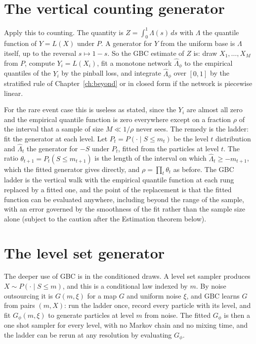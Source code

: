 \section{The vertical counting generator}

Apply this to counting. The quantity is $Z = \int_0^1 \Lambda(s) \, ds$ with $\Lambda$ the quantile function of $Y = L(X)$ under $P$. A generator for $Y$ from the uniform base is $\Lambda$ itself, up to the reversal $s \mapsto 1 - s$. So the GBC estimate of $Z$ is: draw $X_1, \dots, X_M$ from $P$, compute $Y_i = L(X_i)$, fit a monotone network $\hat\Lambda_\phi$ to the empirical quantiles of the $Y_i$ by the pinball loss, and integrate $\hat\Lambda_\phi$ over $[0, 1]$ by the stratified rule of Chapter~\ref{ch:beyond} or in closed form if the network is piecewise linear.

For the rare event case this is useless as stated, since the $Y_i$ are almost all zero and the empirical quantile function is zero everywhere except on a fraction $\rho$ of the interval that a sample of size $M \ll 1/\rho$ never sees. The remedy is the ladder: fit the generator at each level. Let $P_t = P(\cdot \mid S \le m_t)$ be the level $t$ distribution and $\hat\Lambda_t$ the generator for $-S$ under $P_t$, fitted from the particles at level $t$. The ratio $\theta_{t+1} = P_t(S \le m_{t+1})$ is the length of the interval on which $\hat\Lambda_t \ge -m_{t+1}$, which the fitted generator gives directly, and $\rho = \prod_t \theta_t$ as before. The GBC ladder is the vertical walk with the empirical quantile function at each rung replaced by a fitted one, and the point of the replacement is that the fitted function can be evaluated anywhere, including beyond the range of the sample, with an error governed by the smoothness of the fit rather than the sample size alone (subject to the caution after the Estimation theorem below).

\section{The level set generator}

The deeper use of GBC is in the conditioned draws. A level set sampler produces $X \sim P(\cdot \mid S \le m)$, and this is a conditional law indexed by $m$. By noise outsourcing it is $G(m, \xi)$ for a map $G$ and uniform noise $\xi$, and GBC learns $G$ from pairs $(m, X)$: run the ladder once, record every particle with its level, and fit $G_\phi(m, \xi)$ to generate particles at level $m$ from noise. The fitted $G_\phi$ is then a one shot sampler for every level, with no Markov chain and no mixing time, and the ladder can be rerun at any resolution by evaluating $G_\phi$.


